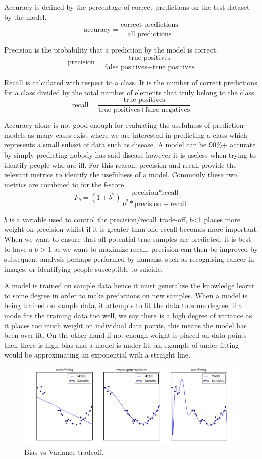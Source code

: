 Accuracy is defined by the percentage of correct predictions on the test dataset by the model. \[ \text{accuracy} = \frac{\text{correct predictions}}{\text{all predictions}}\]

Precision is the probability that a prediction by the model is correct.
 \[ \text{precision} = \frac{\text{true positives}}{\text{false positives}+\text{true positives}}\]

Recall is calculated with respect to a class. It is the number of correct predictions for a class divided by the total number of elements that truly belong to the class.
\[ \text{recall} = \frac{\text{true positives}}{\text{true positives}+\text{false negatives}}\]

Accuracy alone is not good enough for evaluating the usefulness of prediction models as many cases exist where we are interested in predicting a class which represents a small subset of data such as disease. A model can be 90\%+ accurate by simply predicting nobody has said disease however it is useless when trying to identify people who are ill. For this reason, precision and recall provide the relevant metrics to identify the usefulness of a model. Commonly these two metrics are combined to for the f-score.
\[F_{b}=(1+b^2)\frac{\text{precision}*\text{recall}}{b^2*\text{precision}+\text{recall}}\]

\(b\) is a variable used to control the precision/recall trade-off, \(b\)<1 places more weight on precision whilst if it is greater than one recall becomes more important. When we want to ensure that all potential true samples are predicted, it is best to have a \(b\) > 1 as we want to maximize recall, precision can then be improved by subsequent analysis perhaps performed by humans, such as recognising cancer in images, or identifying people susceptible to suicide.

A model is trained on sample data hence it must generalize the knowledge learnt to some degree in order to make predictions on new samples. When a model is being trained on sample data, it attempts to fit the data to some degree, if a mode fits the training data too well, we say there is a high degree of variance as it places too much weight on individual data points, this means the model has been over-fit. On the other hand if not enough weight is placed on data points then there is high bias and a model is under-fit, an example of under-fitting would be approximating an exponential with a straight line. 
\begin{figure}[h]
\centering
 \includegraphics[width=\linewidth]{Selection_019.png}
 \caption{Bias vs Variance tradeoff.}
 \label{fig:bvtradeoff}
\end{figure}

